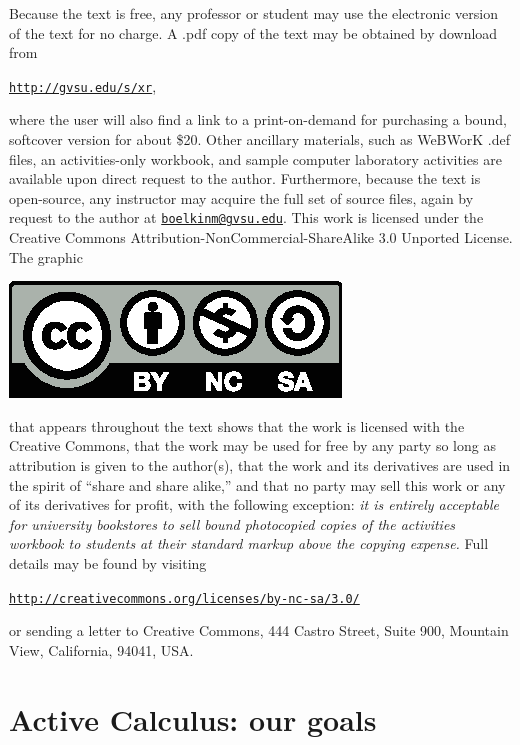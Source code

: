 Because the text is free, any professor or student may use the electronic version of the text for no charge.  A .pdf copy of the text may be obtained by download from
\begin{center} \href{http://gvsu.edu/s/xr}{\texttt{http://gvsu.edu/s/xr}}, \end{center}
where the user will also find a link to a print-on-demand for purchasing a bound, softcover version for about \$20.
Other ancillary materials, such as WeBWorK .def files, an activities-only workbook, and sample computer laboratory activities are available upon direct request to the author.  Furthermore, 
because the text is open-source, any instructor may acquire the full set of source files, again by request to the author at \href{mailto:boelkinm@gvsu.edu}{\texttt{boelkinm@gvsu.edu}}.  
This work is licensed under the Creative Commons Attribution-NonCommercial-ShareAlike 3.0 Unported License.  The graphic 
\begin{center}
\includegraphics{figures/CClicense.eps}
\end{center}
that appears throughout the text shows that the work is licensed with the Creative Commons, that the work may be used for free by any party so long as attribution is given to the author(s), that the work and its derivatives are used in the spirit of ``share and share alike,'' and that no party may sell this work or any of its derivatives for profit, with the following exception:  \emph{it is entirely acceptable for university bookstores to sell bound photocopied copies of the activities workbook to students at their standard markup above the copying expense.}  Full details may be found by visiting
\begin{center}
\href{http://creativecommons.org/licenses/by-nc-sa/3.0/}{\texttt{http://creativecommons.org/licenses/by-nc-sa/3.0/}}
\end{center} 
or sending a letter to Creative Commons, 444 Castro Street, Suite 900, Mountain View, California, 94041, USA. 

\section*{Active Calculus: our goals}

